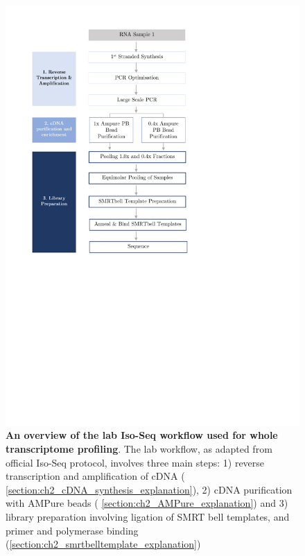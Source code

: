 \begin{figure}[htp]
	\includegraphics[page=1,trim={0 12cm 5cm 1cm},clip,scale = 1]{Figures/ProjectDevelopment_Figures.pdf}
	\captionsetup{width=0.95\textwidth}
	\caption[Iso-Seq Lab workflow used for whole transcriptome sequencing]%
	{\textbf{An overview of the lab Iso-Seq workflow used for whole transcriptome profiling}. The lab workflow, as adapted from official Iso-Seq protocol, involves three main steps: 1) reverse transcription and amplification of cDNA ( \cref{section:ch2_cDNA_synthesis_explanation}), 2) cDNA purification with AMPure beads ( \cref{section:ch2_AMPure_explanation}) and 3) library preparation involving ligation of SMRT bell templates, and primer and polymerase binding (\cref{section:ch2_smrtbelltemplate_explanation})}
	\label{fig:isoseq_wholelab_protocol}
\end{figure}

